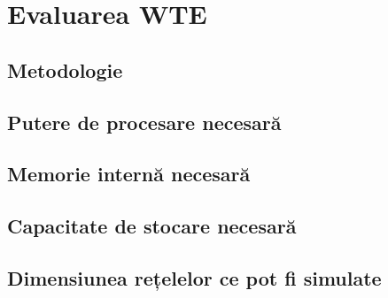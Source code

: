 \section{Evaluarea WTE}

\subsection{Metodologie}
\subsection{Putere de procesare necesară}
\subsection{Memorie internă necesară}
\subsection{Capacitate de stocare necesară}
\subsection{Dimensiunea rețelelor ce pot fi simulate}